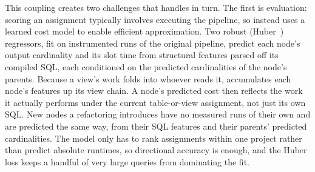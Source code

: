 This coupling creates two challenges that \dagsmith{} handles in turn. 
The first is evaluation: scoring an assignment typically involves executing the pipeline, so \dagsmith{} instead uses a learned cost model to enable efficient approximation. Two robust (Huber~\cite{huber1964robust}) regressors, fit on instrumented runs of the original pipeline, predict each node's output cardinality and its slot time from structural features parsed off its compiled SQL, each conditioned on the predicted cardinalities of the node's parents.
Because a view's work folds into whoever reads it, \dagsmith{} accumulates each node's features up its view chain. A node's predicted cost then reflects the work it actually performs under the current table-or-view assignment, not just its own SQL. New nodes a refactoring introduces have no measured runs of their own and are predicted the same way, from their SQL features and their parents' predicted cardinalities.
The model only has to rank assignments within one project rather than predict absolute runtimes, so directional accuracy is enough, and the Huber loss keeps a handful of very large queries from dominating the fit.
 
